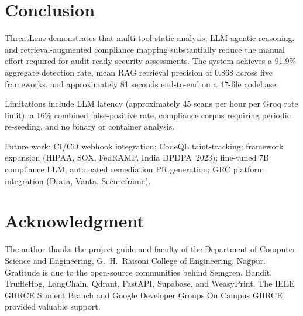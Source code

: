 \documentclass[conference]{IEEEtran}
\begin{document}
\section{Conclusion}
\label{sec:conclusion}

ThreatLens demonstrates that multi-tool static analysis, LLM-agentic
reasoning, and retrieval-augmented compliance mapping substantially
reduce the manual effort required for audit-ready security assessments.
The system achieves a 91.9\% aggregate detection rate, mean RAG
retrieval precision of 0.868 across five frameworks, and approximately
81 seconds end-to-end on a 47-file codebase.

Limitations include LLM latency (approximately 45 scans per hour per
Groq rate limit), a 16\% combined false-positive rate, compliance corpus
requiring periodic re-seeding, and no binary or container analysis.

Future work: CI/CD webhook integration; CodeQL taint-tracking; framework
expansion (HIPAA, SOX, FedRAMP, India DPDPA~2023); fine-tuned 7B
compliance LLM; automated remediation PR generation; GRC platform
integration (Drata, Vanta, Secureframe).

\section*{Acknowledgment}
The author thanks the project guide and faculty of the Department of
Computer Science and Engineering, G.~H.~Raisoni College of Engineering,
Nagpur. Gratitude is due to the open-source communities behind Semgrep,
Bandit, TruffleHog, LangChain, Qdrant, FastAPI, Supabase, and WeasyPrint.
The IEEE GHRCE Student Branch and Google Developer Groups On Campus GHRCE
provided valuable support.
\end{document}
